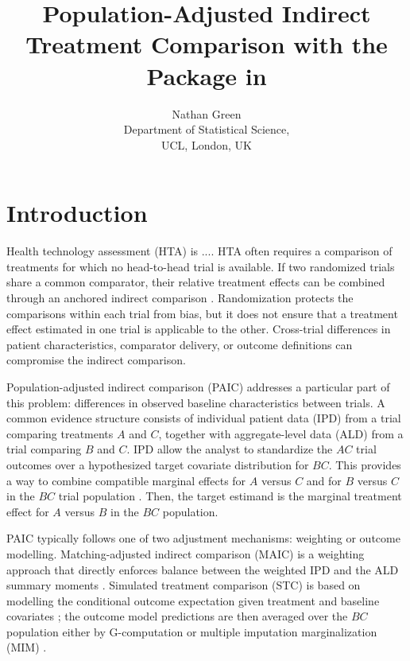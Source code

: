 \documentclass[article]{jss}
\author{Nathan Green \\Department of Statistical Science,\\ UCL, London, UK}
\title{Population-Adjusted Indirect Treatment Comparison with the \pkg{outstandR} Package in \proglang{R}}
\begin{document}
\section{Introduction}
\label{sec:introduction}
Health technology assessment (HTA) is .... HTA often requires a comparison of treatments for which no head-to-head trial is available. If two randomized trials share a common comparator, their relative treatment effects can be combined through an anchored indirect comparison \citep{bucher1997results}. Randomization protects the comparisons within each trial from bias, but it does not ensure that a treatment effect estimated in one trial is applicable to the other. Cross-trial differences in patient characteristics, comparator delivery, or outcome definitions can compromise the indirect comparison.

Population-adjusted indirect comparison (PAIC) addresses a particular part of this problem: differences in observed baseline characteristics between trials. A common evidence structure consists of individual patient data (IPD) from a trial comparing treatments $A$ and $C$, together with aggregate-level data (ALD) from a trial comparing $B$ and $C$. IPD allow the analyst to standardize the $AC$ trial outcomes over a hypothesized target covariate distribution for $BC$. This provides a way to combine compatible marginal effects for $A$ versus $C$ and for $B$ versus $C$ in the $BC$ trial population \citep{RemiroAzocar2022a}. Then, the target estimand is the marginal treatment effect for $A$ versus $B$ in the $BC$ population. 





PAIC typically follows one of two adjustment mechanisms: weighting or outcome modelling. Matching-adjusted indirect comparison (MAIC) is a weighting approach that directly enforces balance between the weighted IPD and the ALD summary moments \citep{signorovitch2010}. Simulated treatment comparison (STC) is based on modelling the conditional outcome expectation given treatment and baseline covariates \citep{caro2010,ishak2015}; the outcome model predictions are then averaged over the $BC$ population either by G-computation \citep{RemiroAzocar2022a} or multiple imputation marginalization (MIM) \citep{RemiroAzocar2022b}. 
\end{document}
